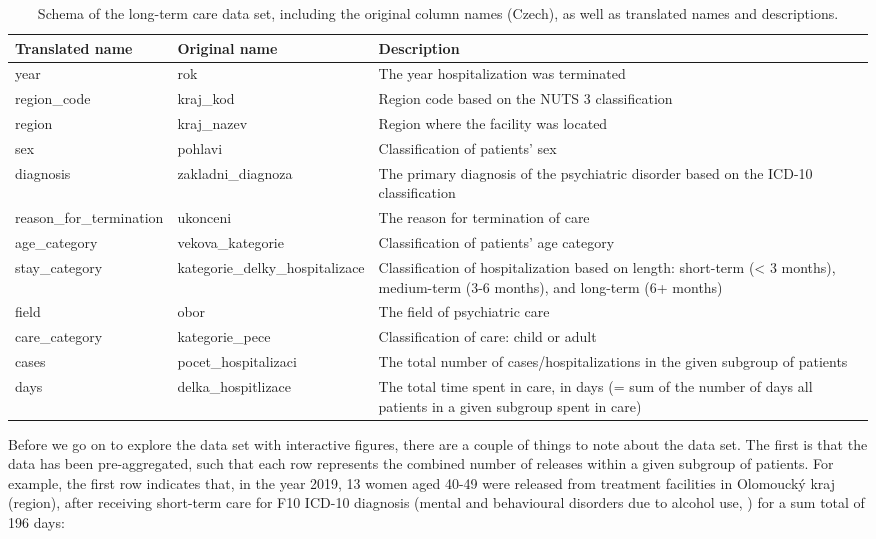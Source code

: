 \documentclass[
  openany]{book}
\theoremstyle{definition}
\theoremstyle{definition}
\theoremstyle{definition}
\theoremstyle{definition}
\theoremstyle{remark}
\begin{document}
\begin{table}
\centering
\caption{\label{tab:longterm-care-schema}Schema of the long-term care data set, including the original column names (Czech), as well as translated names and descriptions.}
\centering
\begin{tabu} to 
\toprule
Translated name & Original name & Description\\
\midrule
year & rok & The year hospitalization was terminated\\
region\_code & kraj\_kod & Region code based on the NUTS 3 classification\\
region & kraj\_nazev & Region where the facility was located\\
sex & pohlavi & Classification of patients’ sex\\
diagnosis & zakladni\_diagnoza & The primary diagnosis of the psychiatric disorder based on the ICD-10 classification\\
\addlinespace
reason\_for\_termination & ukonceni & The reason for termination of care\\
age\_category & vekova\_kategorie & Classification of patients’ age category\\
stay\_category & kategorie\_delky\_hospitalizace & Classification of hospitalization based on length: short-term (< 3 months), medium-term (3-6 months), and long-term (6+ months)\\
field & obor & The field of psychiatric care\\
care\_category & kategorie\_pece & Classification of care: child or adult\\
\addlinespace
cases & pocet\_hospitalizaci & The total number of cases/hospitalizations in the given subgroup of patients\\
days & delka\_hospitlizace & The total time spent in care, in days (= sum of the number of days all patients in a given subgroup spent in care)\\
\bottomrule
\end{tabu}
\end{table}

Before we go on to explore the data set with interactive figures, there are a couple of things to note about the data set. The first is that the data has been pre-aggregated, such that each row represents the combined number of releases within a given subgroup of patients. For example, the first row indicates that, in the year 2019, 13 women aged 40-49 were released from treatment facilities in Olomoucký kraj (region), after receiving short-term care for F10 ICD-10 diagnosis (mental and behavioural disorders due to alcohol use, ) for a sum total of 196 days:
\end{document}
